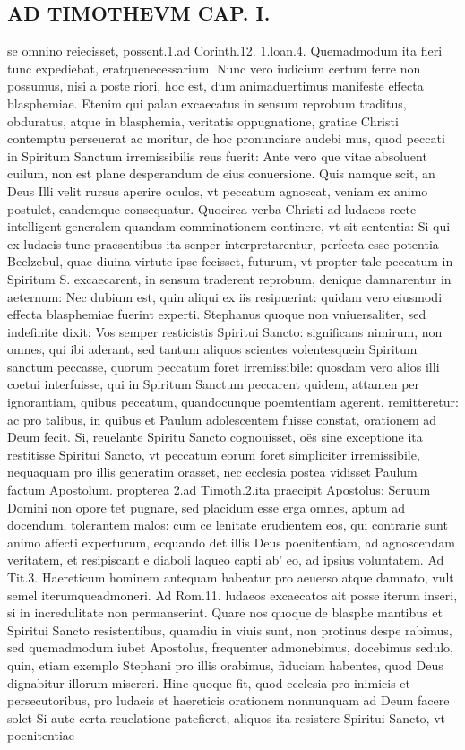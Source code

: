 \documentclass{article}
\begin{document}
\begin{pages}
\section*{AD TIMOTHEVM CAP. I. }
\marginpar{[ p.40 ]}\pstart se omnino reiecisset, possent.1.ad Corinth.12. 1.loan.4. Quemadmodum ita fieri tunc expediebat, eratquenecessarium. Nunc vero iudicium certum ferre non possumus, nisi a poste riori, hoc est, dum animaduertimus manifeste effecta blasphemiae. Etenim qui palan excaecatus in sensum reprobum traditus, obduratus, atque  in blasphemia, veritatis oppugnatione, gratiae Christi contemptu perseuerat ac moritur, de hoc pronunciare audebi mus, quod peccati in Spiritum Sanctum irremissibilis reus fuerit: Ante vero que  vitae absoluent cuilum, non est plane desperandum de eius conuersione. Quis namque  scit, an Deus Illi velit rursus aperire oculos, vt peccatum agnoscat, veniam ex animo postulet, eandemque  consequatur. Quocirca verba Christi ad ludaeos recte intelligent generalem quandam comminationem continere, vt sit sententia: Si qui ex ludaeis tunc praesentibus ita senper interpretarentur, perfecta esse potentia Beelzebul, quae diuina virtute ipse fecisset, futurum, vt propter tale peccatum in Spiritum S. excaecarent, in sensum traderent reprobum, denique  damnarentur in aeternum: Nec dubium est, quin aliqui ex iis resipuerint: quidam vero eiusmodi effecta blasphemiae fuerint experti. Stephanus quoque  non vniuersaliter, sed indefinite dixit: Vos semper resticistis Spiritui Sancto: significans nimirum, non omnes, qui ibi aderant, sed tantum aliquos scientes volentesquein Spiritum sanctum peccasse, quorum peccatum foret irremissibile: quosdam vero alios illi coetui interfuisse, qui in Spiritum Sanctum peccarent quidem, attamen per ignorantiam, quibus peccatum, quandocunque  poemtentiam agerent, remitteretur: ac pro talibus, in quibus et Paulum adolescentem fuisse constat, orationem ad Deum fecit. Si, reuelante Spiritu Sancto cognouisset, oës sine exceptione ita restitisse Spiritui Sancto, vt peccatum eorum foret simpliciter irremissibile, nequaquam pro illis generatim orasset, nec ecclesia postea vidisset Paulum factum Apostolum. propterea 2.ad Timoth.2.ita praecipit Apostolus: Seruum Domini non opore tet pugnare, sed placidum esse erga omnes, aptum ad docendum, tolerantem malos: cum ce lenitate erudientem eos, qui contrarie sunt animo affecti experturum, ecquando det illis Deus poenitentiam, ad agnoscendam veritatem, et resipiscant e diaboli laqueo capti ab' eo, ad ipsius voluntatem. Ad Tit.3. Haereticum hominem antequam habeatur pro aeuerso atque  damnato, vult semel iterumqueadmoneri. Ad Rom.11. ludaeos excaecatos ait posse iterum inseri, si in incredulitate non permanserint. Quare nos quoque  de blasphe mantibus et Spiritui Sancto resistentibus, quamdiu in viuis sunt, non protinus despe rabimus, sed quemadmodum iubet Apostolus, frequenter admonebimus, docebimus sedulo, quin, etiam exemplo Stephani pro illis orabimus, fiduciam habentes, quod Deus dignabitur illorum misereri. Hinc quoque  fit, quod ecclesia pro inimicis et persecutoribus, pro ludaeis et haereticis orationem nonnunquam ad Deum facere solet Si aute certa reuelatione patefieret, aliquos ita resistere Spiritui Sancto, vt poenitentiae 
\end{pages}
\end{document}
